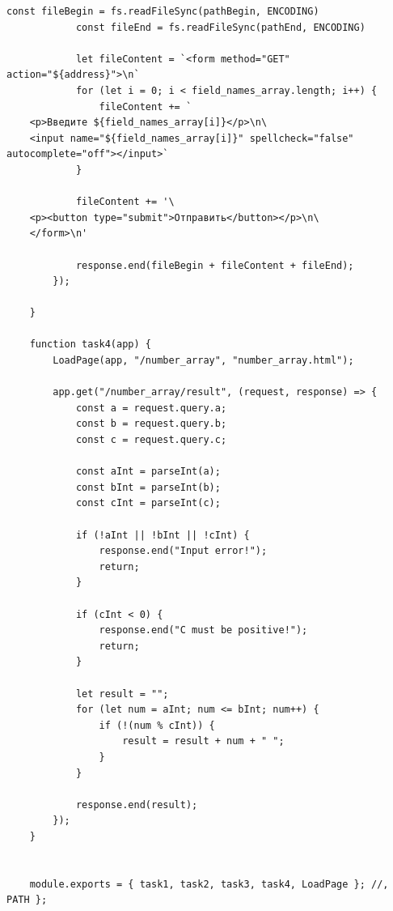 \begin{lstlisting}[caption=Код программы. TASK\_2. Реализация заданий]
			const fileBegin = fs.readFileSync(pathBegin, ENCODING)
			const fileEnd = fs.readFileSync(pathEnd, ENCODING)
	
			let fileContent = `<form method="GET" action="${address}">\n`
			for (let i = 0; i < field_names_array.length; i++) {
				fileContent += `
	<p>Введите ${field_names_array[i]}</p>\n\
	<input name="${field_names_array[i]}" spellcheck="false" autocomplete="off"></input>`
			}
	
			fileContent += '\
	<p><button type="submit">Отправить</button></p>\n\
	</form>\n'
	
			response.end(fileBegin + fileContent + fileEnd);
		});
	
	}
	
	function task4(app) {
		LoadPage(app, "/number_array", "number_array.html");
	
		app.get("/number_array/result", (request, response) => {
			const a = request.query.a;
			const b = request.query.b;
			const c = request.query.c;
	
			const aInt = parseInt(a);
			const bInt = parseInt(b);
			const cInt = parseInt(c);
	
			if (!aInt || !bInt || !cInt) {
				response.end("Input error!");
				return;
			}
	
			if (cInt < 0) {
				response.end("C must be positive!");
				return;
			}
	
			let result = "";
			for (let num = aInt; num <= bInt; num++) {
				if (!(num % cInt)) {
					result = result + num + " ";
				}
			}
	
			response.end(result);
		});
	}
	
	
	module.exports = { task1, task2, task3, task4, LoadPage }; //, PATH };
\end{lstlisting}

